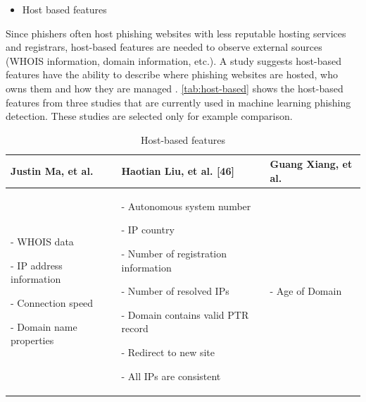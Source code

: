\begin{itemize}
\item Host based features
\end{itemize}
Since phishers often host phishing websites with less reputable hosting
services and registrars, host-based features are needed to observe
external sources (WHOIS information, domain information, etc.). A
study suggests host-based features have the ability to describe where
phishing websites are hosted, who owns them and how they are managed
\citep{ma:2009}. \autoref{tab:host-based} shows the host-based features
from three studies that are currently used in machine learning phishing
detection. These studies are selected only for example comparison.

\begin{table}
\centering{}%
\begin{tabular}{>{\raggedright}p{2cm}>{\raggedright}p{4cm}>{\raggedright}p{2cm}}
\toprule 
\textbf{\scriptsize{}Justin Ma, et al.\citep{ma:2009,ma2:2009}} & \textbf{\scriptsize{}Haotian Liu, et al. {[}46{]}\citep{liu}} & \textbf{\scriptsize{}Guang Xiang, et al. \citep{xiang:2011}}\tabularnewline
\midrule
\midrule 
{\scriptsize{}- WHOIS data}{\scriptsize \par}

{\scriptsize{}- IP address information}{\scriptsize \par}

{\scriptsize{}- Connection speed}{\scriptsize \par}

{\scriptsize{}- Domain name properties } & {\scriptsize{}- Autonomous system number }{\scriptsize \par}

{\scriptsize{}- IP country}{\scriptsize \par}

{\scriptsize{}- Number of registration information}{\scriptsize \par}

{\scriptsize{}- Number of resolved IPs}{\scriptsize \par}

{\scriptsize{}- Domain contains valid PTR record}{\scriptsize \par}

{\scriptsize{}- Redirect to new site}{\scriptsize \par}

{\scriptsize{}- All IPs are consistent} & {\scriptsize{}- Age of Domain}\tabularnewline
\bottomrule
\end{tabular}\protect\caption{\label{tab:host-based}Host-based features \citep{ma:2009,ma2:2009,liu,xiang:2011}}
\end{table}


